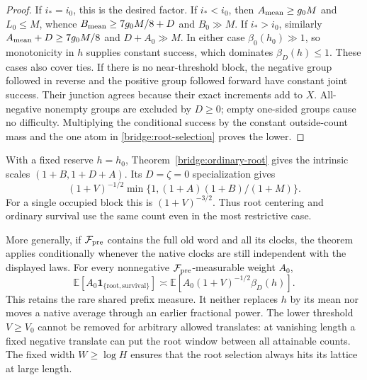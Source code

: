\begin{proof}
If $i_*=i_0$, this is the desired factor. If $i_*<i_0$, then
$A_{\rm mean}\ge g_0M$ and $L_0\le M$, whence
$B_{\rm mean}\ge7g_0M/8+D$ and $B_0\gg M$.
If $i_*>i_0$, similarly
$A_{\rm mean}+D\ge7g_0M/8$ and $D+A_0\gg M$.
In either case $\beta_0(h_0)\gg1$, so monotonicity in $h$ supplies
constant success, which dominates $\beta_D(h)\le1$. These cases
also cover ties. If there is no near-threshold block, the negative
group followed in reverse and the positive group followed forward
have constant joint success. Their junction agrees because their
exact increments add to $X$. All-negative nonempty groups are
excluded by $D\ge0$; empty one-sided groups cause no difficulty.
Multiplying the conditional success by the constant outside-count
mass and the one atom in \eqref{bridge:root-selection} proves the
lower.
\end{proof}

With a fixed reserve $h=h_0$, Theorem~\ref{bridge:ordinary-root}
gives the intrinsic scales $(1+B,1+D+A)$. Its $D=\zeta=0$
specialization gives
\[
 (1+V)^{-1/2}\min\{1,(1+A)(1+B)/(1+M)\}.
\]
For a single occupied block this is $(1+V)^{-3/2}$. Thus root
centering and ordinary survival use the same count even in the
most restrictive case.

More generally, if $\mathcal F_{\rm pre}$ contains the full old
word and all its clocks, the theorem applies conditionally whenever
the native clocks are still independent with the displayed laws.
For every nonnegative $\mathcal F_{\rm pre}$-measurable weight $A_0$,
\[
 \mathbb E[A_0\mathbf1_{\{\mathrm{root, survival}\}}]
 \asymp\mathbb E[A_0(1+V)^{-1/2}\beta_D(h)].
\]
This retains the rare shared prefix measure. It neither replaces $h$
by its mean nor moves a native average through an earlier fractional
power. The lower threshold $V\ge V_0$ cannot be removed for arbitrary
allowed translates: at vanishing length a fixed negative translate
can put the root window between all attainable counts. The fixed
width $W\ge\log H$ ensures that the root selection always hits its
lattice at large length.
